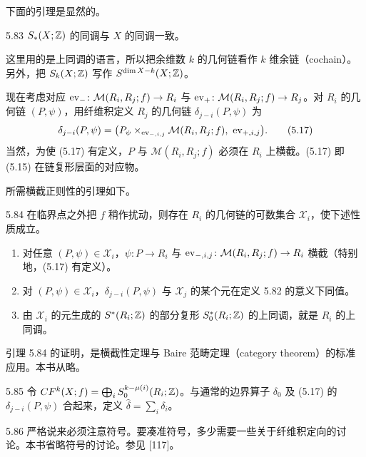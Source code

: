 下面的引理是显然的。

\begin{lemma}{5.83}
  $S_*(X;\mathbb{Z})$ 的同调与 $X$ 的同调一致。
\end{lemma}

这里用的是上同调的语言，所以把余维数 $k$ 的几何链看作 $k$ 维余链（cochain）。另外，把 $S_k(X;\mathbb{Z})$ 写作 $S^{\dim X-k}(X;\mathbb{Z})$。

现在考虑对应 $\operatorname{ev}_-\colon\mathcal{M}(R_i,R_j;f)\to R_i$ 与 $\operatorname{ev}_+\colon\mathcal{M}(R_i,R_j;f)\to R_j$。对 $R_i$ 的几何链 $(P,\psi)$，用纤维积定义 $R_j$ 的几何链 $\delta_{j-i}(P,\psi)$ 为
\begin{equation}
  \delta_{j-i}(P,\psi)=\bigl(P_\psi\times_{\ev_{-,i,j}}\mathcal{M}(R_i,R_j;f),\ \ev_{+,i,j}\bigr). \tag{5.17}
\end{equation}
当然，为使 (5.17) 有定义，$P$ 与 $\mathcal{M}(R_i,R_j;f)$ 必须在 $R_i$ 上横截。(5.17) 即 (5.15) 在链复形层面的对应物。

所需横截正则性的引理如下。

\begin{lemma}{5.84}
  在临界点之外把 $f$ 稍作扰动，则存在 $R_i$ 的几何链的可数集合 $\mathcal{X}_i$，使下述性质成立。
  \begin{enumerate}[label=(\arabic*),leftmargin=2.4em,itemsep=1pt,topsep=2pt]
    \item 对任意 $(P,\psi)\in\mathcal{X}_i$，$\psi\colon P\to R_i$ 与 $\operatorname{ev}_{-,i,j}\colon\mathcal{M}(R_i,R_j;f)\to R_i$ 横截（特别地，(5.17) 有定义）。
    \item 对 $(P,\psi)\in\mathcal{X}_i$，$\delta_{j-i}(P,\psi)$ 与 $\mathcal{X}_j$ 的某个元在定义 5.82 的意义下同值。
    \item 由 $\mathcal{X}_i$ 的元生成的 $S^*(R_i;\mathbb{Z})$ 的部分复形 $S^*_0(R_i;\mathbb{Z})$ 的上同调，就是 $R_i$ 的上同调。
  \end{enumerate}
\end{lemma}

引理 5.84 的证明，是横截性定理与 Baire 范畴定理（category theorem）的标准应用。本书从略。

\begin{definition}{5.85}
  令 $CF^k(X;f)=\bigoplus_i S^{k-\mu(i)}_0(R_i;\mathbb{Z})$。与通常的边界算子 $\delta_0$ 及 (5.17) 的 $\delta_{j-i}(P,\psi)$ 合起来，定义 $\hat\delta=\sum_i\delta_i$。
\end{definition}

\begin{remark}{5.86}
  严格说来必须注意符号。要凑准符号，多少需要一些关于纤维积定向的讨论。本书省略符号的讨论。参见 [117]。
\end{remark}

